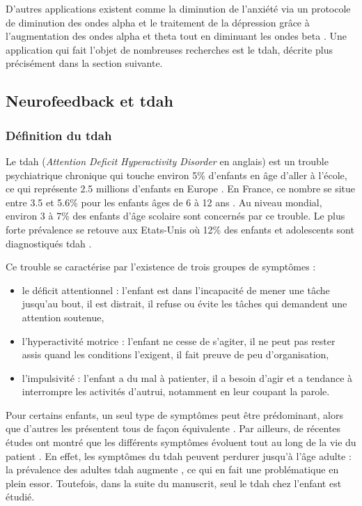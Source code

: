 D'autres applications existent comme la diminution de l'anxiété via un protocole de diminution des ondes alpha \citep{Budzynski2009} et le traitement de la dépression
grâce à l'augmentation des ondes alpha et theta tout en diminuant les ondes beta \citep{Hurt2014}. Une application qui fait l'objet de nombreuses recherches
est le \gls{tdah}, décrite plus précisément dans la section suivante.

\subsection{Neurofeedback et \gls{tdah}} \label{nfb_and_adhd}

\subsubsection{Définition du \gls{tdah}}

Le \gls{tdah} (\textit{Attention Deficit Hyperactivity Disorder} en anglais) est un trouble psychiatrique chronique qui touche environ 5\% d'enfants en âge d'aller à l'école, 
ce qui représente 2.5 millions d'enfants en Europe \citep{DSM-5}. En France, ce nombre se situe entre 3.5 et 5.6\% pour les enfants âges de 6 à 12 ans \citep{Lecendreux2011}. 
Au niveau mondial, environ 3 à 7\% des enfants d'âge scolaire sont concernés par ce trouble. Le plus forte prévalence se retouve aux Etats-Unis où 12\% des enfants et adolescents
sont diagnostiqués \gls{tdah} \citep{Collins2016}.

Ce trouble se caractérise par l'existence de trois groupes de symptômes \citep{HAS} : 
\begin{itemize}
\item le déficit attentionnel : l'enfant est dans l'incapacité de mener une tâche jusqu'au bout, il est distrait, il refuse ou évite les tâches qui demandent
une attention soutenue,
\item l'hyperactivité motrice : l'enfant ne cesse de s'agiter, il ne peut pas rester assis quand les conditions l'exigent, il fait preuve de peu d'organisation,
\item l'impulsivité : l'enfant a du mal à patienter, il a besoin d'agir et a tendance à interrompre les activités d'autrui, notamment en leur coupant la parole.
\end{itemize}
Pour certains enfants, un seul type de symptômes peut être prédominant, alors que d'autres les présentent tous de façon équivalente \citep{DSM-5}. Par ailleurs, de récentes 
études ont montré que les différents symptômes évoluent tout au long de la vie du patient \citep{CFDCAP, Epstein2013}. En effet, les symptômes du \gls{tdah}
peuvent perdurer jusqu'à l'âge adulte \citep{Faraone2006} : la prévalence des adultes \gls{tdah} augmente \citep{Chung2019}, ce qui en fait une problématique
en plein essor. Toutefois, dans la suite du manuscrit, seul le \gls{tdah} chez l'enfant est étudié. 

